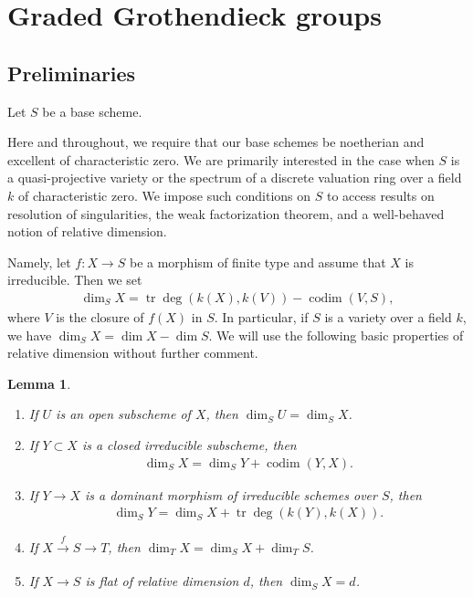 \documentclass{amsart}
\newtheorem{lem}[thm]{Lemma}
\theoremstyle{definition}
\DeclareMathOperator{\codim}{codim}
\DeclareMathOperator{\tr}{tr}
\numberwithin{equation}{section}
\begin{document}
\section{Graded Grothendieck groups}

\subsection{Preliminaries}
Let $S$ be a base scheme. 

Here and throughout, we require that our base schemes be noetherian and excellent of characteristic zero. We are primarily interested in the case when $S$ is a quasi-projective variety or the spectrum of a discrete valuation ring over a field $k$ of characteristic zero. We impose such conditions on $S$ to access results on resolution of singularities, the weak factorization theorem, and a well-behaved notion of relative dimension. 

Namely, let $f: X \rightarrow S$ be a morphism of finite type and assume that $X$ is irreducible. Then we set 
\begin{align*}
    \dim_S X = \tr \deg ( k(X), k(V) ) - \codim(V,S),
\end{align*}
where $V$ is the closure of $f(X)$ in $S$. In particular, if $S$ is a variety over a field $k$, we have $\dim_S X = \dim X - \dim S$. We will use the following basic properties of relative dimension without further comment.

\begin{lem}\label{dimension properties}
\begin{enumerate}
    \item If $U$ is an open subscheme of $X$, then $\dim_S U = \dim_S X$.
    \item If $Y \subset X$ is a closed irreducible subscheme, then 
        \begin{align*}
            \dim_S X = \dim_S Y + \codim(Y, X).
        \end{align*}
    \item If $Y \rightarrow X$ is a dominant morphism of irreducible schemes over $S$, then
        \begin{align*}
            \dim_S Y = \dim_S X + \tr \deg(k(Y), k(X)).
        \end{align*}
    \item If $X \xrightarrow[]{f} S \rightarrow T$, then $\dim_T X = \dim_S X + \dim_T S$.
    \item If $X \rightarrow S$ is flat of relative dimension $d$, then $\dim_S X = d$.
\end{enumerate}
\end{lem}
\end{document}

